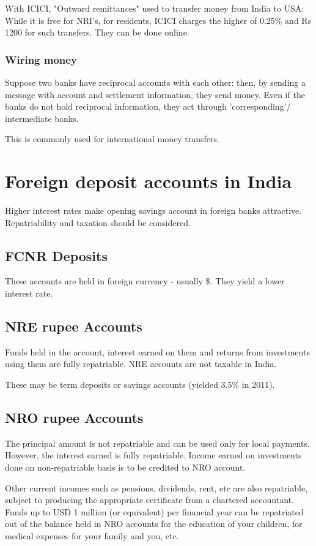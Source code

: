 \documentclass[oneside, article]{memoir}
\begin{document}
With ICICI, "Outward remittances" used to transfer money from India to USA: While it is free for NRI's, for residents, ICICI charges the higher of 0.25\% and Rs 1200 for such transfers. They can be done online.

\subsubsection{Wiring money}
Suppose two banks have reciprocal accounts with each other: then, by sending a message with account and settlement information, they send money. Even if the banks do not hold reciprocal information, they act through 'corresponding'/ intermediate banks.

This is commonly used for international money transfers.

\section{Foreign deposit accounts in India}
Higher interest rates make opening savings account in foreign banks attractive. Repatriability and taxation should be considered.

\subsection{FCNR Deposits}
These accounts are held in foreign currency - usually \$. They yield a lower interest rate.

\subsection{NRE rupee Accounts}
Funds held in the account, interest earned on them and returns from investments using them are fully repatriable. NRE accounts are not taxable in India.

These may be term deposits or savings accounts (yielded 3.5\% in 2011). 

\subsection{NRO rupee Accounts}
The principal amount is not repatriable and can be used only for local payments. However, the interest earned is fully repatriable.  Income earned on investments done on non-repatriable basis is to be credited to NRO account.

Other current incomes such as pensions, dividends, rent, etc are also repatriable, subject to producing the appropriate certificate from a chartered accountant. Funds up to USD 1 million (or equivalent) per financial year can be repatriated out of the balance held in NRO accounts for the education of your children, for medical expenses for your family and you, etc. 
\end{document}
